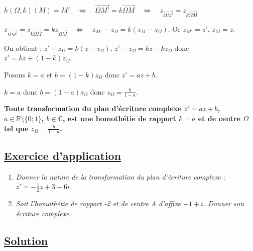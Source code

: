 \documentclass[12pt,a4paper]{article}
\begin{document}
\noindent $h(\Omega, k)(M) = M' \quad \iff \quad \overrightarrow{\Omega M'} = k \overrightarrow{\Omega M} \quad \iff \quad z_{\overrightarrow{\Omega M'}} = z_{k \overrightarrow{\Omega M}}$

\vspace{1em}

\noindent $z_{\overrightarrow{\Omega M'}} = z_{k \overrightarrow{\Omega M}} = k z_{\overrightarrow{\Omega M}} \quad \iff \quad z_{M'} - z_{\Omega} = k(z_M - z_{\Omega})$. Or $z_{M'} = z'$, $z_M = z$.

\vspace{1em}

\noindent On obtient : $z' - z_{\Omega} = k(z - z_{\Omega})$, \quad $z' - z_{\Omega} = kz - kz_{\Omega}$ \quad donc $z' = kz + (1 - k) z_{\Omega}$.

\vspace{1em}

\noindent Posons $k = a$ \quad et \quad $b = (1 - k) z_{\Omega}$ \quad donc $z' = az + b$.

\vspace{1em}

\noindent $k = a$ \quad donc $b = (1 - a) z_{\Omega}$ \quad donc \quad $z_{\Omega} = \frac{b}{1 - a}$.

\vspace{1em}

\noindent \textbf{Toute transformation du plan d'écriture complexe $z' = az + b$, $a \in \mathbb{R} \setminus \{0; 1\}$, $b \in \mathbb{C}$, est une homothétie de rapport $k = a$ et de centre $\Omega$ tel que $z_{\Omega} = \frac{b}{1 - a}$.}

\subsection*{ \underline{Exercice d'application}}

\vspace{1cm}

\begin{enumerate}
    \item \textit{Donner la nature de la transformation du plan d'écriture complexe : $z' = -\frac{1}{2}z + 3 - 6i$.}
    \item \textit{Soit l'homothétie de rapport -2 et de centre A d'affixe $-1 + i$. Donner son écriture complexe.}
\end{enumerate}

\subsection*{ \underline{Solution}}
\end{document}
